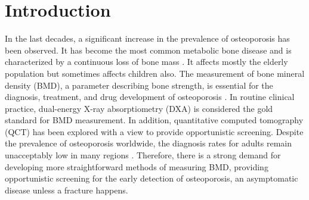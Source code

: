 \documentclass[times,twocolumn,final]{elsarticle}
\begin{document}
\section{Introduction}
In the last decades, a significant increase in the prevalence of osteoporosis has been observed. It has become the most common metabolic bone disease and is characterized by a continuous loss of bone mass \citep{compston_osteoporosis_2019,yang_road_2020,zou_advances_2020,noh_molecular_2020,yu_epidemiology_2019}. It affects mostly the elderly population but sometimes affects children also\citep{ward_contemporary_2020}.
The measurement of bone mineral density (BMD), a parameter describing bone strength, is essential for the diagnosis, treatment, and drug development of osteoporosis \citep{loffler_X-ray-based_2020,ward_contemporary_2020,li_osteoporosis_2021,lorentzon_treating_2019,kung_factors_2013,iki_bone_2001}.
In routine clinical practice, dual-energy X-ray absorptiometry (DXA) \citep{iki_bone_2001,mazess_dual-energy_1990,blake_role_2007,kroger_bone_1992,omalley_trends_2011,pisani_screening_2013} is considered the gold standard for BMD measurement.
In addition, quantitative computed tomography (QCT) \citep{engelke_clinical_2008,mueller_phantom-less_2011,aggarwal_opportunistic_2021,ziemlewicz_opportunistic_2015} has been explored with a view to provide opportunistic screening.
Despite the prevalence of osteoporosis worldwide, the diagnosis rates for adults remain unacceptably low in many regions \citep{snodgrass_osteoporosis_2022,choi_prevalence_2012,papaioannou_osteoporosis_2008,mccloskey_osteoporosis_2021}.
Therefore, there is a strong demand for developing more straightforward methods of measuring BMD, providing opportunistic screening for the early detection of osteoporosis, an asymptomatic disease unless a fracture happens.
\end{document}
